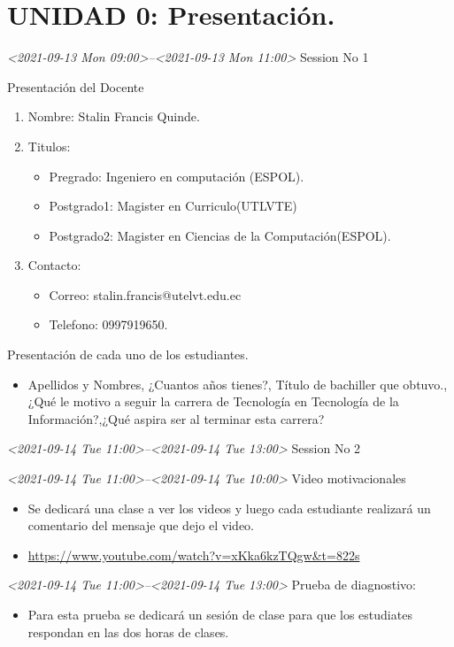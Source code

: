 \documentclass[presentation, aspectratio=54]{beamer}
\begin{document}
\section{UNIDAD 0: Presentación.}
\label{sec:orgcc5d59d}
\begin{frame}[label={sec:org2e83ca4}]{\textit{<2021-09-13 Mon 09:00>--<2021-09-13 Mon 11:00> } Session No 1}
\begin{block}{Presentación del Docente}
\begin{enumerate}
\item Nombre: Stalin Francis Quinde.
\item Titulos:
\begin{itemize}
\item Pregrado: Ingeniero en computación (ESPOL).
\item Postgrado1: Magister en
Curriculo(UTLVTE)
\item Postgrado2: Magister en Ciencias de la Computación(ESPOL).
\end{itemize}
\item Contacto:
\begin{itemize}
\item Correo: stalin.francis@utelvt.edu.ec
\item Telefono: 0997919650.
\end{itemize}
\end{enumerate}
\begin{block}{Presentación de cada uno de los estudiantes.}
\begin{itemize}
\item Apellidos y Nombres, ¿Cuantos años tienes?, Título de bachiller que obtuvo., ¿Qué le motivo a  seguir la carrera de Tecnología en Tecnología de la Información?,¿Qué aspira ser al terminar esta carrera?
\end{itemize}
\end{block}
\end{block}
\end{frame}
\begin{frame}[label={sec:org60401ed}]{\textit{<2021-09-14 Tue 11:00>--<2021-09-14 Tue 13:00> } Session No 2}
\begin{block}{\textit{<2021-09-14 Tue 11:00>--<2021-09-14 Tue 10:00> } Video motivacionales}
\begin{itemize}
\item Se dedicará una clase a ver los videos y luego cada estudiante realizará un comentario del mensaje que dejo el video.
\item \url{https://www.youtube.com/watch?v=xKka6kzTQgw\&t=822s}
\end{itemize}
\end{block}

\begin{block}{\textit{<2021-09-14 Tue 11:00>--<2021-09-14 Tue 13:00> } Prueba de diagnostivo:}
\begin{itemize}
\item Para esta prueba se dedicará un sesión de clase para que los estudiates respondan en las dos horas de clases.
\end{itemize}
\end{block}
\end{frame}
\end{document}
